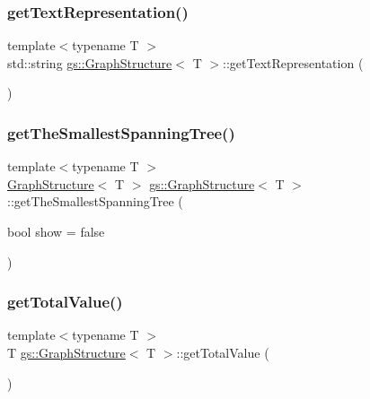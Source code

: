 \subsubsection{\texorpdfstring{get\+Text\+Representation()}{getTextRepresentation()}}
{\footnotesize\ttfamily template$<$typename T $>$ \\
std\+::string \mbox{\hyperlink{classgs_1_1_graph_structure}{gs\+::\+Graph\+Structure}}$<$ T $>$\+::get\+Text\+Representation (\begin{DoxyParamCaption}{ }\end{DoxyParamCaption})}

\mbox{\label{classgs_1_1_graph_structure_a84565337bd8e3ca9a22512b3e7d0e4fb}} 
\subsubsection{\texorpdfstring{get\+The\+Smallest\+Spanning\+Tree()}{getTheSmallestSpanningTree()}}
{\footnotesize\ttfamily template$<$typename T $>$ \\
\mbox{\hyperlink{classgs_1_1_graph_structure}{Graph\+Structure}}$<$ T $>$ \mbox{\hyperlink{classgs_1_1_graph_structure}{gs\+::\+Graph\+Structure}}$<$ T $>$\+::get\+The\+Smallest\+Spanning\+Tree (\begin{DoxyParamCaption}\item[{bool}]{show = {\ttfamily false} }\end{DoxyParamCaption})}

\mbox{\label{classgs_1_1_graph_structure_a430f8d15cb01da7f7c7054b7a9e831ee}} 
\subsubsection{\texorpdfstring{get\+Total\+Value()}{getTotalValue()}}
{\footnotesize\ttfamily template$<$typename T $>$ \\
T \mbox{\hyperlink{classgs_1_1_graph_structure}{gs\+::\+Graph\+Structure}}$<$ T $>$\+::get\+Total\+Value (\begin{DoxyParamCaption}{ }\end{DoxyParamCaption})}

